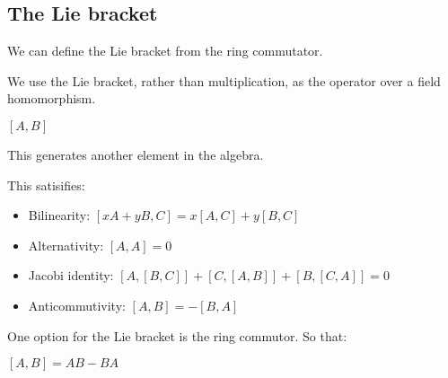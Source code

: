 
\subsection{The Lie bracket}

We can define the Lie bracket from the ring commutator.

We use the Lie bracket, rather than multiplication, as the operator over a field homomorphism.

\([A, B]\)

This generates another element in the algebra.

This satisifies:

\begin{itemize}
\item Bilinearity: \([xA+yB,C]=x[A,C]+y[B,C]\)
\item Alternativity: \([A,A]=0\)
\item Jacobi identity: \([A, [B,C]]+[C,[A,B]]+[B,[C,A]]=0\)
\item Anticommutivity: \([A, B]=-[B,A]\)
\end{itemize}

One option for the Lie bracket is the ring commutor. So that:

\([A,B]=AB-BA\)

